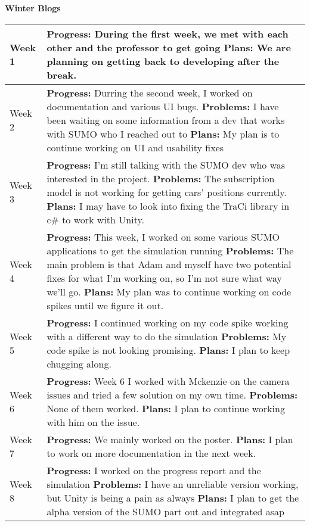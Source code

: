 \documentclass[letterpaper, 10pt, onecolumn, draftclsnofoot]{IEEEtran}
\begin{document}
        \begin{center}
        \large{\textbf{Winter Blogs}} \\
        \begin{longtable}{|p{4cm}|p{10cm}|}
            \hline
            Week 1 & \textbf{Progress:} During the first week, we met with each other and the professor to get going \textbf{Plans:} We are planning on getting back to developing after the break.\\
            \hline
            Week 2 & \textbf{Progress:} Durring the second week, I worked on documentation and various UI bugs.
            \textbf{Problems:} I have been waiting on some information from a dev that works with SUMO who I reached out to \textbf{Plans:} My plan is to continue working on UI and usability fixes\\
            \hline
            Week 3 & \textbf{Progress:} I'm still talking with the SUMO dev who was interested in the project. \textbf{Problems:} The subscription model is not working for getting cars' positions currently. \textbf{Plans:} I may have to look into fixing the TraCi library in c\# to work with Unity.\\
            \hline
            Week 4 & \textbf{Progress:} This week, I worked on some various SUMO applications to get the simulation running \textbf{Problems:} The main problem is that Adam and myself have two potential fixes for what I'm working on, so I'm not sure what way we'll go. \textbf{Plans:} My plan was to continue working on code spikes until we figure it out.\\
            \hline
            Week 5 & \textbf{Progress:} I continued working on my code spike working with a different way to do the simulation \textbf{Problems:} My code spike is not looking promising. \textbf{Plans:} I plan to keep chugging along.\\
            \hline
            Week 6 & \textbf{Progress:} Week 6 I worked with Mckenzie on the camera issues and tried a few solution on my own time. \textbf{Problems:} None of them worked. \textbf{Plans:} I plan to continue working with him on the issue.\\
            \hline
            Week 7 & \textbf{Progress:} We mainly worked on the poster. \textbf{Plans:} I plan to work on more documentation in the next week. \\
            \hline
            Week 8 & \textbf{Progress:} I worked on the progress report and the simulation \textbf{Problems:} I have an unreliable version working, but Unity is being a pain as always \textbf{Plans:} I plan to get the alpha version of the SUMO part out and integrated asap \\

\end{longtable}
\end{center}
\end{document}
